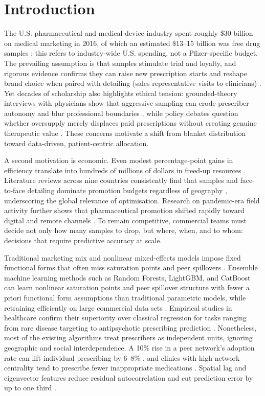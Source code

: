\section{Introduction}\label{sec:intro}

The U.S. pharmaceutical and medical-device industry spent roughly \$30 billion on medical marketing in 2016, of which an estimated \$13--15 billion was free drug samples \citep{Schwartz2019}; this refers to industry-wide U.S. spending, not a Pfizer-specific budget. The prevailing assumption is that samples stimulate trial and loyalty, and rigorous evidence confirms they can raise new prescription starts and reshape brand choice when paired with detailing (sales representative visits to clinicians) \citep{Gonul2001,MizikJacobson2004,DonohueCevascoRosenthal2018}. Yet decades of scholarship also highlights ethical tension: grounded-theory interviews with physicians show that aggressive sampling can erode prescriber autonomy and blur professional boundaries \citep{Malik2020}, while policy debates question whether oversupply merely displaces paid prescriptions without creating genuine therapeutic value \citep{JosephMantrala2009}. These concerns motivate a shift from blanket distribution toward data-driven, patient-centric allocation.

A second motivation is economic. Even modest percentage-point gains in efficiency translate into hundreds of millions of dollars in freed-up resources \citep{Schwartz2019}. Literature reviews across nine countries consistently find that samples and face-to-face detailing dominate promotion budgets regardless of geography \citep{RajputPandey2022}, underscoring the global relevance of optimisation. Research on pandemic-era field activity further shows that pharmaceutical promotion shifted rapidly toward digital and remote channels \citep{Chiplunkar2020,KhanBasak2021}. To remain competitive, commercial teams must decide not only how many samples to drop, but where, when, and to whom: decisions that require predictive accuracy at scale.

Traditional marketing mix and nonlinear mixed-effects models impose fixed functional forms that often miss saturation points and peer spillovers \citep{MontoyaNetzerJedidi2010}. Ensemble machine learning methods such as Random Forests, LightGBM, and CatBoost can learn nonlinear saturation points and peer spillover structure with fewer a priori functional form assumptions than traditional parametric models, while retraining efficiently on large commercial data sets \citep{Chamberlain2022}. Empirical studies in healthcare confirm their superiority over classical regression for tasks ranging from rare disease targeting \citep{Cai2017} to antipsychotic prescribing prediction \citep{Antonazzoetal2022}. Nonetheless, most of the existing algorithms treat prescribers as independent units, ignoring geographic and social interdependence. A 10\% rise in a peer network's adoption rate can lift individual prescribing by 6--8\% \citep{IyengarVanDenBulteValente2011}, and clinics with high network centrality tend to prescribe fewer inappropriate medications \citep{Wangetal2023}. Spatial lag and eigenvector features reduce residual autocorrelation and cut prediction error by up to one third \citep{Liuetal2022}.

